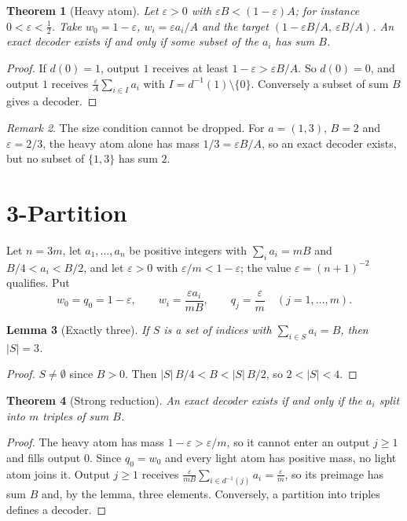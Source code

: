 \documentclass[11pt,a4paper]{article}
\newtheorem{theorem}{Theorem}
\newtheorem{lemma}[theorem]{Lemma}
\theoremstyle{definition}
\theoremstyle{remark}
\newtheorem{remark}[theorem]{Remark}
\begin{document}
\begin{theorem}[Heavy atom]
Let \(\varepsilon>0\) with \(\varepsilon B<(1-\varepsilon)A\); for instance
\(0<\varepsilon<\tfrac12\). Take \(w_0=1-\varepsilon\), \(w_i=\varepsilon a_i/A\)
and the target \((1-\varepsilon B/A,\ \varepsilon B/A)\). An exact decoder exists
if and only if some subset of the \(a_i\) has sum \(B\).
\end{theorem}

\begin{proof}
If \(d(0)=1\), output \(1\) receives at least \(1-\varepsilon>\varepsilon B/A\).
So \(d(0)=0\), and output \(1\) receives \(\frac{\varepsilon}{A}\sum_{i\in I}a_i\)
with \(I=d^{-1}(1)\setminus\{0\}\). Conversely a subset of sum \(B\) gives a decoder.
\end{proof}

\begin{remark}
The size condition cannot be dropped. For \(a=(1,3)\), \(B=2\) and
\(\varepsilon=2/3\), the heavy atom alone has mass \(1/3=\varepsilon B/A\), so an
exact decoder exists, but no subset of \(\{1,3\}\) has sum \(2\).
\end{remark}

\section{3-Partition}

Let \(n=3m\), let \(a_1,\dots,a_n\) be positive integers with
\(\sum_i a_i=mB\) and \(B/4<a_i<B/2\), and let \(\varepsilon>0\) with
\(\varepsilon/m<1-\varepsilon\); the value \(\varepsilon=(n+1)^{-2}\) qualifies.
Put
\[
  w_0=q_0=1-\varepsilon,\qquad
  w_i=\frac{\varepsilon a_i}{mB},\qquad
  q_j=\frac{\varepsilon}{m}\quad(j=1,\dots,m).
\]

\begin{lemma}[Exactly three]
If \(S\) is a set of indices with \(\sum_{i\in S}a_i=B\), then \(|S|=3\).
\end{lemma}

\begin{proof}
\(S\neq\emptyset\) since \(B>0\). Then \(|S|\,B/4<B<|S|\,B/2\), so \(2<|S|<4\).
\end{proof}

\begin{theorem}[Strong reduction]
An exact decoder exists if and only if the \(a_i\) split into \(m\) triples of
sum \(B\).
\end{theorem}

\begin{proof}
The heavy atom has mass \(1-\varepsilon>\varepsilon/m\), so it cannot enter an
output \(j\ge1\) and fills output \(0\). Since \(q_0=w_0\) and every light atom
has positive mass, no light atom joins it. Output \(j\ge1\) receives
\(\frac{\varepsilon}{mB}\sum_{i\in d^{-1}(j)}a_i=\frac{\varepsilon}{m}\), so its
preimage has sum \(B\) and, by the lemma, three elements. Conversely, a
partition into triples defines a decoder.
\end{proof}
\end{document}
